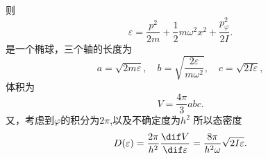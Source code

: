 \documentclass[12pt]{article}
\begin{document}
则
\begin{equation}
	\varepsilon = \frac{p^2}{2m} + \frac{1}{2} m \omega^2 x^2 + \frac{p^2_\varphi}{2I}.
\end{equation}
是一个椭球，三个轴的长度为
\begin{equation}
	a=\sqrt{2m\varepsilon},\quad b=\sqrt{\frac{2\varepsilon}{m \omega^2}},\quad c=\sqrt{2I\varepsilon},
\end{equation}
体积为
\begin{equation}
	V = \frac{4\pi}{3} abc.
\end{equation}
又，考虑到$\varphi$的积分为$2\pi$,以及不确定度为$h^2$
所以态密度
\begin{equation}
	D(\varepsilon) = \frac{2\pi}{h^2}\frac{\dif V}{\dif \varepsilon} = \frac{8\pi}{h^2\omega} \sqrt{2I\varepsilon}.
\end{equation}
















\end{document}
